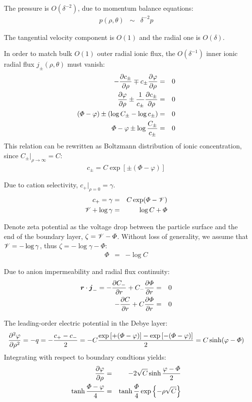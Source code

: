 The pressure is $O(\delta^{-2})$, due to momentum balance equations:
\begin{eqnarray}
 \nonumber p(\rho, \theta) &\sim& \delta^{-2} p
\end{eqnarray}

The tangential velocity component is $O(1)$ and the radial one is $O(\delta)$.

In order to match bulk $O(1)$ outer radial ionic flux, 
the $O(\delta^{-1})$ inner ionic radial flux $j_\pm(\rho, \theta)$ must vanish:
\begin{eqnarray}
 \nonumber -\frac{\partial c_\pm}{\partial \rho} \mp c_\pm \frac{\partial \varphi}{\partial \rho} &=& 0 \\
 \nonumber \frac{\partial \varphi}{\partial \rho} \pm\frac{1}{c_\pm}\frac{\partial c_\pm}{\partial \rho} &=& 0 \\
 \nonumber \left(\varPhi - \varphi\right) \pm\left(\log C_\pm - \log c_\pm\right) &=& 0 \\
 \nonumber \varPhi - \varphi \pm \log \frac{C_\pm}{c_\pm} &=& 0
\end{eqnarray}
This relation can be rewritten as Boltzmann distribution of ionic concentration,
since $C_\pm|_{\rho\rightarrow\infty} = C$:
\begin{eqnarray}
c_\pm = C \exp\left[\pm(\varPhi - \varphi)\right]
\end{eqnarray}

Due to cation selectivity, $c_+|_{\rho=0} = \gamma$.
\begin{eqnarray}
 \nonumber c_+ = \gamma &=& C \exp(\varPhi - \mathscr{V}) \\
 \nonumber \mathscr{V} + \log \gamma &=& \log C + \varPhi
\end{eqnarray}

Denote zeta potential as the voltage drop between the particle surface and the end of
the boundary layer, $\zeta = \mathscr{V} - \varPhi$. 
Without loss of generality, 
we assume that $\mathscr{V} = -\log\gamma$, thus $\zeta = -\log\gamma-\varPhi$:
\begin{eqnarray}
\varPhi &=& -\log C
\end{eqnarray}

Due to anion impermeability and radial flux continuity:
\begin{eqnarray}
 \nonumber \boldsymbol{r} \cdot \boldsymbol{j}_- = -\frac{\partial C_-}{\partial r} + C_- \frac{\partial \varPhi}{\partial r} &=& 0 \\
-\frac{\partial C}{\partial r} + C \frac{\partial \varPhi}{\partial r} &=& 0
\end{eqnarray}

The leading-order electric potential in the Debye layer:
\begin{eqnarray}  \nonumber
\frac{\partial ^2 \varphi}{\partial \rho^2} = -q = -\frac{c_+ - c_-}{2} = 
-C\frac{\exp\left[+(\varPhi - \varphi)\right] - \exp\left[-(\varPhi - \varphi)\right]}{2} = 
C \sinh(\varphi - \varPhi)
\end{eqnarray}
Integrating with respect to boundary condtions yields:
\begin{eqnarray}  \nonumber
\frac{\partial \varphi}{\partial \rho} &=& -2\sqrt{C}\sinh\frac{\varphi - \varPhi}{2} \\  \nonumber
\tanh\frac{\varPhi - \varphi}{4} &=& \tanh\frac{\varPhi}{4} \exp\left\{-\rho \sqrt{C}\right\}
\end{eqnarray}

